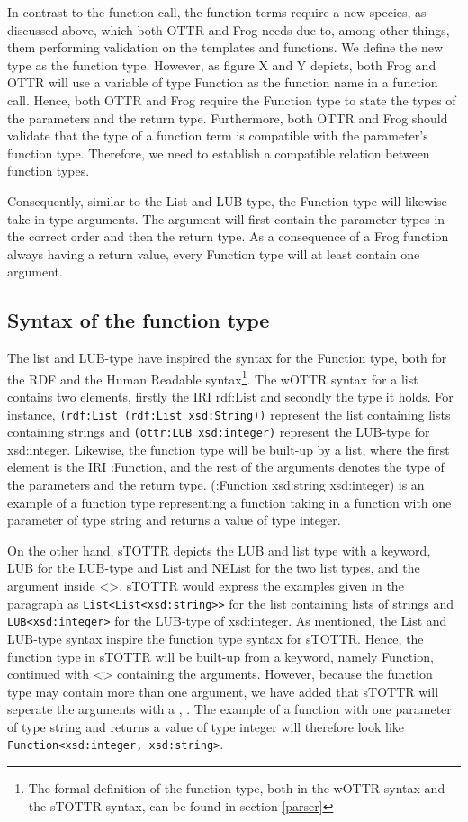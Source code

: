 \para
In contrast to the function call, the function terms require a new species, as discussed above, which both OTTR and Frog needs due to, among other things, them performing validation on the templates and functions. We define the new type as the function type. However, as figure X and Y depicts, both Frog and OTTR will use a variable of type Function as the function name in a function call. Hence, both OTTR and Frog require the Function type to state the types of the parameters and the return type. Furthermore, both OTTR and Frog should validate that the type of a function term is compatible with the parameter's function type. Therefore, we need to establish a compatible relation between function types. 

\para 
Consequently, similar to the List and LUB-type, the Function type will likewise take in type arguments. The argument will first contain the parameter types in the correct order and then the return type. As a consequence of a Frog function always having a return value, every Function type will at least contain one argument.

\subsection{Syntax of the function type}
The list and LUB-type have inspired the syntax for the Function type, both for the RDF and the Human Readable syntax\footnote{The formal definition of the function type, both in the wOTTR syntax and the sTOTTR syntax, can be found in section \ref{parser}}. The wOTTR syntax for a list contains two elements, firstly the IRI rdf:List and secondly the type it holds. For instance, \lstinline{(rdf:List (rdf:List xsd:String))} represent the list containing lists containing strings and \lstinline{(ottr:LUB xsd:integer)} represent the LUB-type for xsd:integer. Likewise, the function type will be built-up by a list, where the first element is the IRI :Function, and the rest of the arguments denotes the type of the parameters and the return type. (:Function xsd:string xsd:integer) is an example of a function type representing a function taking in a function with one parameter of type string and returns a value of type integer. 

\para
On the other hand, sTOTTR depicts the LUB and list type with a keyword, LUB for the LUB-type and List and NEList for the two list types, and the argument inside <>. sTOTTR would express the examples given in the paragraph as \lstinline{List<List<xsd:string>>} for the list containing lists of strings and \lstinline{LUB<xsd:integer>} for the LUB-type of xsd:integer. As mentioned, the List and LUB-type syntax inspire the function type syntax for sTOTTR. Hence, the function type in sTOTTR will be built-up from a keyword, namely Function, continued with <> containing the arguments. However, because the function type may contain more than one argument, we have added that sTOTTR will seperate the arguments with a , .  The example of a function with one parameter of type string and returns a value of type integer will therefore look like \lstinline{Function<xsd:integer, xsd:string>}.

